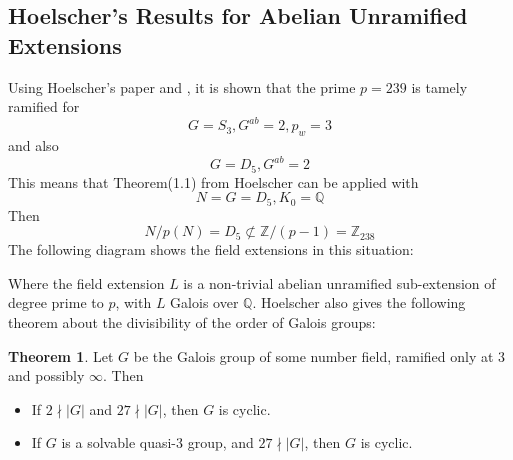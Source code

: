 \documentclass[12pt]{extarticle}
\newcommand{\Q}{\mathbb{Q}}
\newcommand{\Z}{\mathbb{Z}}
\newcommand{\<}{\langle}
\renewcommand{\>}{\rangle}
\theoremstyle{definition}
\newtheorem{theorem}{Theorem}
\begin{document}
\subsection{Hoelscher's Results for Abelian Unramified Extensions}
Using Hoelscher's paper \cite{HOEL} and \cite{JONE}, it is shown that 
the prime $p=239$ is tamely ramified for 
\begin{equation}
  G=S_3, G^{ab} = 2, p_w =3  
\end{equation} and also 
\begin{equation}
    G=D_5,G^{ab} = 2 
\end{equation}
This means that Theorem(1.1) from Hoelscher can be applied \cite{HOEL} with
\begin{equation}
    N = G = D_5, K_0 = \Q
\end{equation}
Then 
\begin{equation}
N/p(N) = D_5 \not\subset \Z/(p-1) = \Z_{238}
\end{equation}
The following diagram shows the field extensions in this situation: 
\begin{center}
    
\end{center}
\par
Where the field extension $L$ is a non-trivial abelian unramified sub-extension of degree prime to $p$, with $L$ Galois over $\Q$.
Hoelscher also gives the following theorem about the divisibility of the order of Galois groups: 
\begin{theorem}
Let $G$ be the Galois group of some number field, ramified only at 3 and possibly $\infty$. Then \begin{itemize}
\item If $2 \nmid |G|$ and $ 27 \nmid |G|$, then $G$ is cyclic.
\item If $G$ is a solvable quasi-3 group, and $ 27 \nmid |G|$, then $G$ is cyclic.
\end{itemize}
\end{theorem}
\end{document}
